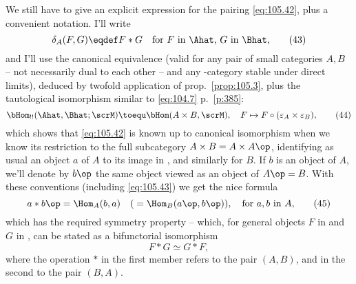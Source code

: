 We still have to give an explicit expression for the pairing
\eqref{eq:105.42}, plus a convenient notation. I'll write
\begin{equation}
  \label{eq:105.43}
  \delta_A(F,G) \eqdef F * G \quad \text{for $F$ in \Ahat, $G$ in \Bhat,}\tag{43}
\end{equation}
and I'll use the canonical equivalence (valid for any pair of small
categories $A,B$ -- not necessarily dual to each other -- and any
\scrU-category stable under direct limits), deduced by twofold
application of prop.\ \ref{prop:105.3}, plus the tautological
isomorphism similar to \eqref{eq:104.7} p.\ \ref{p:385}:
\begin{equation}
  \label{eq:105.44}
  \bHom_{!!}(\Ahat,\Bhat;\scrM) \toequ \bHom(A\times B,\scrM), \quad
  F\mapsto F\circ(\varepsilon_A\times\varepsilon_B),\tag{44}
\end{equation}
which shows that \eqref{eq:105.42} is known up to canonical
isomorphism when we know its restriction to the full subcategory
$A\times B=A\times A\op$, identifying as usual an object $a$ of $A$ to
its image in \Ahat, and similarly for $B$. If $b$ is an object of $A$,
we'll denote by $b\op$ the same object viewed as an object of
$A\op=B$. With these conventions (including \eqref{eq:105.43}) we get
the nice formula
\begin{equation}
  \label{eq:105.45}
  a * b\op = \Hom_A(b,a) \quad(\; = \Hom_B(a\op,b\op)), \quad
  \text{for $a,b$ in $A$,}\tag{45}
\end{equation}
which has the required symmetry property -- which, for general objects
$F$ in \Ahat{} and $G$ in \Bhat, can be stated as a bifunctorial
isomorphism
\begin{equation}
  \label{eq:105.46}
  F * G \simeq G * F,\tag{46}
\end{equation}
where the operation $*$ in the first member refers to the pair $(A,B)$,
and in the second to the pair $(B,A)$.

